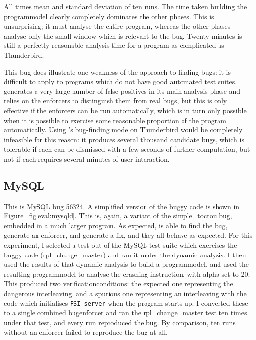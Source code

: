 All times mean and standard deviation of ten runs.  The time taken
building the \gls{programmodel} clearly completely dominates the other
phases.  This is unsurprising; it must analyse the entire program,
whereas the other phases analyse only the small window which is
relevant to the bug.  Twenty minutes is still a perfectly reasonable
analysis time for a program as complicated as Thunderbird.

This bug does illustrate one weakness of the {\technique} approach to
finding bugs: it is difficult to apply to programs which do not have
good automated test suites.  {\Technique} generates a very large
number of false positives in its main analysis phase and relies on the
enforcers to distinguish them from real bugs, but this is only
effective if the enforcers can be run automatically, which is in turn
only possible when it is possible to exercise some reasonable
proportion of the program automatically.  Using {\technique}'s
bug-finding mode on Thunderbird would be completely infeasible for
this reason: it produces several thousand candidate bugs, which is
tolerable if each can be dismissed with a few seconds of further
computation, but not if each requires several minutes of user
interaction.

\subsection{MySQL}
\label{sect:eval:mysql}

This is MySQL bug 56324\needCite{}.  A simplified version of the buggy
code is shown in Figure~\ref{fig:eval:mysqld}.  This is, again, a
variant of the simple\_toctou bug, embedded in a much larger program.
As expected, {\implementation} is able to find the bug, generate an
enforcer, and generate a fix, and they all behave as expected.  For
this experiment, I selected a test out of the MySQL test suite which
exercises the buggy code (rpl\_change\_master) and ran it under the
dynamic analysis.  I then used the results of that dynamic analysis to
build a \gls{programmodel}, and used the resulting \gls{programmodel}
to analyse the crashing instruction, with \gls{alpha} set to 20.  This
produced two \glspl{verificationcondition}: the expected one
representing the dangerous interleaving, and a spurious one
representing an interleaving with the code which initialises
\texttt{PSI\_server} when the program starts up.  I converted these to
a single combined \gls{bugenforcer} and ran the rpl\_change\_master
test ten times under that test, and every run reproduced the bug.  By
comparison, ten runs without an enforcer failed to reproduce the bug
at all.

